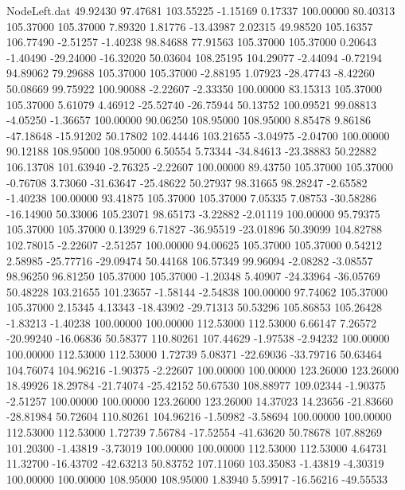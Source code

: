 \begin{filecontents}{NodeLeft.dat}
  49.92430   97.47681  103.55225    -1.15169    0.17337  100.00000   80.40313  105.37000  105.37000    7.89320    1.81776  -13.43987    2.02315
  49.98520  105.16357  106.77490    -2.51257   -1.40238   98.84688   77.91563  105.37000  105.37000    0.20643   -1.40490  -29.24000  -16.32020
  50.03604  108.25195  104.29077    -2.44094   -0.72194   94.89062   79.29688  105.37000  105.37000   -2.88195    1.07923  -28.47743   -8.42260
  50.08669   99.75922  100.90088    -2.22607   -2.33350  100.00000   83.15313  105.37000  105.37000    5.61079    4.46912  -25.52740  -26.75944
  50.13752  100.09521   99.08813    -4.05250   -1.36657  100.00000   90.06250  108.95000  108.95000    8.85478    9.86186  -47.18648  -15.91202
  50.17802  102.44446  103.21655    -3.04975   -2.04700  100.00000   90.12188  108.95000  108.95000    6.50554    5.73344  -34.84613  -23.38883
  50.22882  106.13708  101.63940    -2.76325   -2.22607  100.00000   89.43750  105.37000  105.37000   -0.76708    3.73060  -31.63647  -25.48622
  50.27937   98.31665   98.28247    -2.65582   -1.40238  100.00000   93.41875  105.37000  105.37000    7.05335    7.08753  -30.58286  -16.14900
  50.33006  105.23071   98.65173    -3.22882   -2.01119  100.00000   95.79375  105.37000  105.37000    0.13929    6.71827  -36.95519  -23.01896
  50.39099  104.82788  102.78015    -2.22607   -2.51257  100.00000   94.00625  105.37000  105.37000    0.54212    2.58985  -25.77716  -29.09474
  50.44168  106.57349   99.96094    -2.08282   -3.08557   98.96250   96.81250  105.37000  105.37000   -1.20348    5.40907  -24.33964  -36.05769
  50.48228  103.21655  101.23657    -1.58144   -2.54838  100.00000   97.74062  105.37000  105.37000    2.15345    4.13343  -18.43902  -29.71313
  50.53296  105.86853  105.26428    -1.83213   -1.40238  100.00000  100.00000  112.53000  112.53000    6.66147    7.26572  -20.99240  -16.06836
  50.58377  110.80261  107.44629    -1.97538   -2.94232  100.00000  100.00000  112.53000  112.53000    1.72739    5.08371  -22.69036  -33.79716
  50.63464  104.76074  104.96216    -1.90375   -2.22607  100.00000  100.00000  123.26000  123.26000   18.49926   18.29784  -21.74074  -25.42152
  50.67530  108.88977  109.02344    -1.90375   -2.51257  100.00000  100.00000  123.26000  123.26000   14.37023   14.23656  -21.83660  -28.81984
  50.72604  110.80261  104.96216    -1.50982   -3.58694  100.00000  100.00000  112.53000  112.53000    1.72739    7.56784  -17.52554  -41.63620
  50.78678  107.88269  101.20300    -1.43819   -3.73019  100.00000  100.00000  112.53000  112.53000    4.64731   11.32700  -16.43702  -42.63213
  50.83752  107.11060  103.35083    -1.43819   -4.30319  100.00000  100.00000  108.95000  108.95000    1.83940    5.59917  -16.56216  -49.55533

\end{filecontents}
